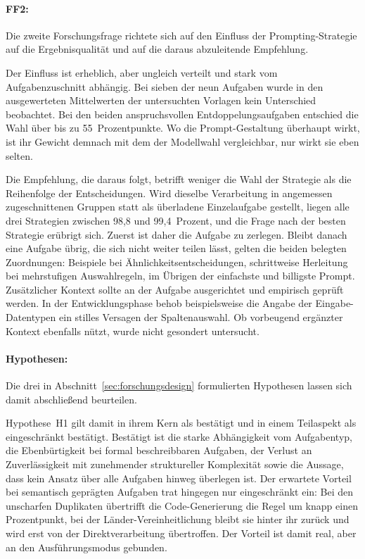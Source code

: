 \paragraph{FF2:} Die zweite Forschungsfrage richtete sich auf den Einfluss der Prompting-Strategie auf die Ergebnisqualität und auf die daraus abzuleitende Empfehlung.

Der Einfluss ist erheblich, aber ungleich verteilt und stark vom Aufgabenzuschnitt abhängig. Bei sieben der neun Aufgaben wurde in den ausgewerteten Mittelwerten der untersuchten Vorlagen kein Unterschied beobachtet. Bei den beiden anspruchsvollen Entdoppelungsaufgaben entschied die Wahl über bis zu 55~Prozentpunkte. Wo die Prompt-Gestaltung überhaupt wirkt, ist ihr Gewicht demnach mit dem der Modellwahl vergleichbar, nur wirkt sie eben selten.

Die Empfehlung, die daraus folgt, betrifft weniger die Wahl der Strategie als die Reihenfolge der Entscheidungen. Wird dieselbe Verarbeitung in angemessen zugeschnittenen Gruppen statt als überladene Einzelaufgabe gestellt, liegen alle drei Strategien zwischen 98,8 und 99,4~Prozent, und die Frage nach der besten Strategie erübrigt sich. Zuerst ist daher die Aufgabe zu zerlegen. Bleibt danach eine Aufgabe übrig, die sich nicht weiter teilen lässt, gelten die beiden belegten Zuordnungen: Beispiele bei Ähnlichkeitsentscheidungen, schrittweise Herleitung bei mehrstufigen Auswahlregeln, im Übrigen der einfachste und billigste Prompt. Zusätzlicher Kontext sollte an der Aufgabe ausgerichtet und empirisch geprüft werden. In der Entwicklungsphase behob beispielsweise die Angabe der Eingabe-Datentypen ein stilles Versagen der Spaltenauswahl. Ob vorbeugend ergänzter Kontext ebenfalls nützt, wurde nicht gesondert untersucht.

\paragraph{Hypothesen:} Die drei in Abschnitt~\ref{sec:forschungsdesign} formulierten Hypothesen lassen sich damit abschließend beurteilen.

Hypothese~H1 gilt damit in ihrem Kern als bestätigt und in einem Teilaspekt als eingeschränkt bestätigt. Bestätigt ist die starke Abhängigkeit vom Aufgabentyp, die Ebenbürtigkeit bei formal beschreibbaren Aufgaben, der Verlust an Zuverlässigkeit mit zunehmender struktureller Komplexität sowie die Aussage, dass kein Ansatz über alle Aufgaben hinweg überlegen ist. Der erwartete Vorteil bei semantisch geprägten Aufgaben trat hingegen nur eingeschränkt ein: Bei den unscharfen Duplikaten übertrifft die Code-Generierung die Regel um knapp einen Prozentpunkt, bei der Länder-Vereinheitlichung bleibt sie hinter ihr zurück und wird erst von der Direktverarbeitung übertroffen. Der Vorteil ist damit real, aber an den Ausführungsmodus gebunden.

